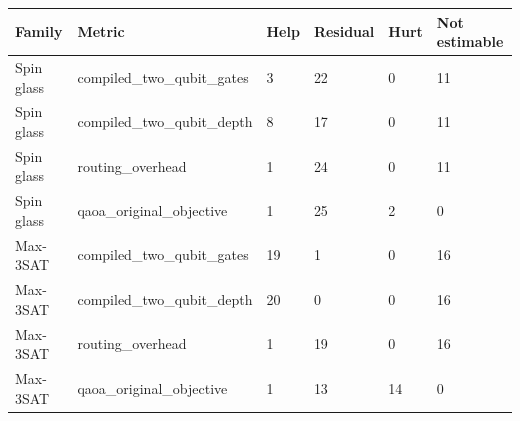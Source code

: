 \begin{tabular}{llllll}
\hline
Family & Metric & Help & Residual & Hurt & Not estimable \\
\hline
Spin glass & compiled\_two\_qubit\_gates & 3 & 22 & 0 & 11 \\
Spin glass & compiled\_two\_qubit\_depth & 8 & 17 & 0 & 11 \\
Spin glass & routing\_overhead & 1 & 24 & 0 & 11 \\
Spin glass & qaoa\_original\_objective & 1 & 25 & 2 & 0 \\
Max-3SAT & compiled\_two\_qubit\_gates & 19 & 1 & 0 & 16 \\
Max-3SAT & compiled\_two\_qubit\_depth & 20 & 0 & 0 & 16 \\
Max-3SAT & routing\_overhead & 1 & 19 & 0 & 16 \\
Max-3SAT & qaoa\_original\_objective & 1 & 13 & 14 & 0 \\
\hline
\end{tabular}

